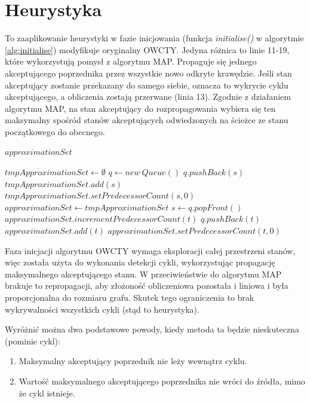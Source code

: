\section{Heurystyka}

To zaaplikowanie heurystyki w fazie inicjowania (funkcja \textit{initialise()} w algorytmie \ref{alg:initialise}) modyfikuje oryginalny OWCTY.
Jedyna różnica to linie 11-19, które wykorzystują pomysł z algorytmu MAP.
Propaguje się jednego akceptującego poprzednika przez wszystkie nowo odkryte krawędzie.
Jeśli stan akceptujący zostanie przekazany do samego siebie, oznacza to wykrycie cyklu akceptującego, a obliczenia zostają przerwane (linia 13).
Zgodnie z działaniem algorytmu MAP, na stan akceptujący do rozpropagowania wybiera się ten maksymalny spośród stanów akceptujących odwiedzonych na ścieżce ze stanu początkowego do obecnego.

\begin{algorithm}
\caption{$ eliminateNoAccepting(approximationSet) $}
\label{alg:eliminateNoAccepting}
\begin{algorithmic}[1]
\REQUIRE $ approximationSet $

\STATE $ tmpApproximationSet \leftarrow \emptyset $
\STATE $ q \leftarrow new\ Queue() $
    \STATE $ q.pushBack(s) $
    \STATE $ tmpApproximationSet.add(s) $
    \STATE $ tmpApproximationSet.setPredecessorCount(s,0) $
  \ENDIF
\ENDFOR
\STATE $ approximationSet \leftarrow tmpApproximationSet $
  \STATE $ s \leftarrow q.popFront() $
      \STATE $ approximationSet.incrementPredecessorCount(t) $
    \ELSE
      \STATE $ q.pushBack(t) $
      \STATE $ approximationSet.add(t) $
      \STATE $ approximationSet.setPredecessorCount(t,0) $
    \ENDIF
  \ENDFOR
\ENDWHILE
\end{algorithmic}
\end{algorithm}

Faza inicjacji algorytmu OWCTY wymaga eksploracji całej przestrzeni stanów, więc została użyta do wykonania detekcji cykli, wykorzystując propagację maksymalnego akceptującego stanu.
W przeciwieństwie do algorytmu MAP brakuje to repropagacji, aby złożoność obliczeniowa pozostała i liniowa i była proporcjonalna do rozmiaru grafu.
Skutek tego ograniczenia to brak wykrywalności wszystkich cykli (stąd to heurystyka).

\noindent
Wyróżnić można dwa podstawowe powody, kiedy metoda ta będzie nieskuteczna (pominie cykl):
\begin{enumerate}
  \item Maksymalny akceptujący poprzednik nie leży wewnątrz cyklu.
  \item Wartość maksymalnego akceptującego poprzednika nie wróci do źródła, mimo że cykl istnieje.
\end{enumerate}

